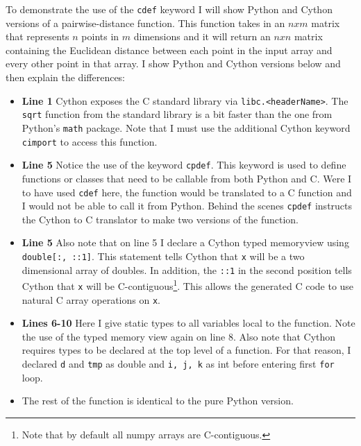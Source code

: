     To demonstrate the use of the \texttt{cdef} keyword I will show Python and Cython versions of a pairwise-distance function. This function takes in an $n x m$ matrix that represents $n$ points in $m$ dimensions and it will return an $n x n$ matrix containing the Euclidean distance between each point in the input array and every other point in that array. I show Python and Cython versions below and then explain the differences:

    \vspace{.2in}
    
    

    \begin{itemize}
      \item \textbf{Line 1} Cython exposes the C standard library via \texttt{libc.<headerName>}. The \texttt{sqrt} function from the standard library is a bit faster than the one from Python's \texttt{math} package. Note that I must use the additional Cython keyword \texttt{cimport} to access this function.
      \item \textbf{Line 5} Notice the use of the keyword \texttt{cpdef}. This keyword is used to define functions or classes that need to be callable from both Python and C. Were I to have used \texttt{cdef} here, the function would be translated to a C function and I would not be able to call it from Python. Behind the scenes \texttt{cpdef} instructs the Cython to C translator to make two versions of the function.
      \item \textbf{Line 5} Also note that on line 5 I declare a Cython typed memoryview using \texttt{double[:, ::1]}. This statement tells Cython that \texttt{x} will be a two dimensional array of doubles. In addition, the \texttt{::1} in the second position tells Cython that \texttt{x} will be C-contiguous\footnote{Note that by default all numpy arrays are C-contiguous.}. This allows the generated C code to use natural C array operations on \texttt{x}.
      \item \textbf{Lines 6-10} Here I give static types to all variables local to the function. Note the use of the typed memory view again on line 8. Also note that Cython requires types to be declared at the top level of a function. For that reason, I declared \texttt{d} and \texttt{tmp} as double and \texttt{i, j, k} as int before entering first \texttt{for} loop.
      \item The rest of the function is identical to the pure Python version.
    \end{itemize}

